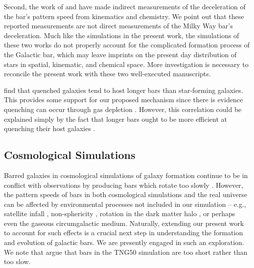 \documentclass[twocolumn,linenumbers]{aastex631}
\begin{document}
Second, the work of \citet{2021MNRAS.500.4710C} and \citet{2021MNRAS.505.2412C}
have made indirect measurements of the deceleration of the bar's pattern speed
from kinematics and chemistry. We point out that these reported measurements are
not direct measurements of the Milky Way bar's deceleration. Much like the
simulations in the present work, the simulations of these two works do not
properly account for the complicated formation process of the Galactic bar,
which may leave imprints on the present day distribution of stars in spatial,
kinematic, and chemical space. More investigation is necessary to reconcile the
present work with these two well-executed manuscripts.

\citet{2020MNRAS.495.4158F} find that quenched galaxies tend to host longer bars
than star-forming galaxies. This provides some support for our proposed
mechanism since there is evidence quenching can occur through gas depletion
\citep[e.g.][]{2021Natur.597..485W}. However, this correlation could be
explained simply by the fact that longer bars ought to be more efficient at
quenching their host galaxies \citep[e.g][]{2015AA...580A.116G}.

\subsection{Cosmological Simulations}
Barred galaxies in cosmological simulations of galaxy formation continue to be
in conflict with observations by producing bars which rotate too slowly
\citep{2017MNRAS.469.1054A, 2019MNRAS.483.2721P, 2021AA...650L..16F,
2022ApJ...940...61F}. However, the pattern speeds of bars in both cosmological
simulations and the real universe can be affected by environmental processes not
included in our simulation -- e.g., satellite infall
\citep{2011Natur.477..301P}, non-sphericity \citep{2013MNRAS.429.1949A},
rotation in the dark matter halo \citep{2013MNRAS.434.1287S,
2014ApJ...783L..18L, 2018MNRAS.476.1331C, 2019MNRAS.488.5788C}, or perhaps even
the gaseous circumgalactic medium. Naturally, extending our present work to
account for such effects is a crucial next step in understanding the formation
and evolution of galactic bars. We are presently engaged in such an exploration.
We note that \citet{2022ApJ...940...61F} argue that bars in the TNG50 simulation
are too short rather than too slow.
\end{document}
